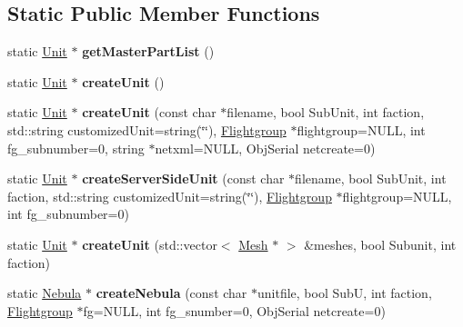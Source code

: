 \subsection*{Static Public Member Functions}
\begin{DoxyCompactItemize}
\item 
static \hyperlink{classUnit}{Unit} $\ast$ {\bfseries get\+Master\+Part\+List} ()\hypertarget{classUnitFactory_af2d4b0bcc7622d5a13d9d7c258824413}{}\label{classUnitFactory_af2d4b0bcc7622d5a13d9d7c258824413}

\item 
static \hyperlink{classUnit}{Unit} $\ast$ {\bfseries create\+Unit} ()\hypertarget{classUnitFactory_ab307ecd81c1373a307069277a8234fb3}{}\label{classUnitFactory_ab307ecd81c1373a307069277a8234fb3}

\item 
static \hyperlink{classUnit}{Unit} $\ast$ {\bfseries create\+Unit} (const char $\ast$filename, bool Sub\+Unit, int faction, std\+::string customized\+Unit=string(\char`\"{}\char`\"{}), \hyperlink{classFlightgroup}{Flightgroup} $\ast$flightgroup=N\+U\+LL, int fg\+\_\+subnumber=0, string $\ast$netxml=N\+U\+LL, Obj\+Serial netcreate=0)\hypertarget{classUnitFactory_a2fe94bbc13a5cf6c4fc6c0346d304df0}{}\label{classUnitFactory_a2fe94bbc13a5cf6c4fc6c0346d304df0}

\item 
static \hyperlink{classUnit}{Unit} $\ast$ {\bfseries create\+Server\+Side\+Unit} (const char $\ast$filename, bool Sub\+Unit, int faction, std\+::string customized\+Unit=string(\char`\"{}\char`\"{}), \hyperlink{classFlightgroup}{Flightgroup} $\ast$flightgroup=N\+U\+LL, int fg\+\_\+subnumber=0)\hypertarget{classUnitFactory_a0cb0ef3b44384da5253a67b266435d2a}{}\label{classUnitFactory_a0cb0ef3b44384da5253a67b266435d2a}

\item 
static \hyperlink{classUnit}{Unit} $\ast$ {\bfseries create\+Unit} (std\+::vector$<$ \hyperlink{classMesh}{Mesh} $\ast$ $>$ \&meshes, bool Subunit, int faction)\hypertarget{classUnitFactory_a1454bfb0c4d94a35ade9fe6d127dba4e}{}\label{classUnitFactory_a1454bfb0c4d94a35ade9fe6d127dba4e}

\item 
static \hyperlink{classNebula}{Nebula} $\ast$ {\bfseries create\+Nebula} (const char $\ast$unitfile, bool SubU, int faction, \hyperlink{classFlightgroup}{Flightgroup} $\ast$fg=N\+U\+LL, int fg\+\_\+snumber=0, Obj\+Serial netcreate=0)\hypertarget{classUnitFactory_a97806bdb5f5a559d2bfb80b8539167ff}{}\label{classUnitFactory_a97806bdb5f5a559d2bfb80b8539167ff}


\end{DoxyCompactItemize}
